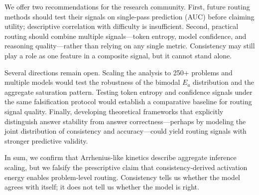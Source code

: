 \documentclass{article}
\begin{document}
We offer two recommendations for the research community. First, future routing methods should test their signals on single-pass prediction (AUC) before claiming utility; descriptive correlation with difficulty is insufficient. Second, practical routing should combine multiple signals---token entropy, model confidence, and reasoning quality---rather than relying on any single metric. Consistency may still play a role as one feature in a composite signal, but it cannot stand alone.

Several directions remain open. Scaling the analysis to 250+ problems and multiple models would test the robustness of the bimodal $E_a$ distribution and the aggregate saturation pattern. Testing token entropy and confidence signals under the same falsification protocol would establish a comparative baseline for routing signal quality. Finally, developing theoretical frameworks that explicitly distinguish answer stability from answer correctness---perhaps by modeling the joint distribution of consistency and accuracy---could yield routing signals with stronger predictive validity.

In sum, we confirm that Arrhenius-like kinetics describe aggregate inference scaling, but we falsify the prescriptive claim that consistency-derived activation energy enables problem-level routing. Consistency tells us whether the model agrees with itself; it does not tell us whether the model is right.



\end{document}
